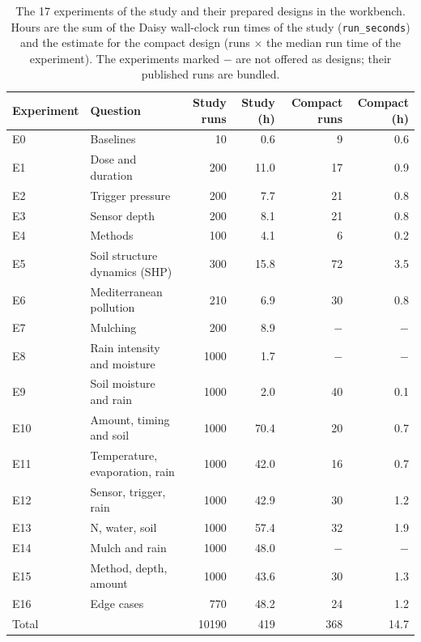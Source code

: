\documentclass[preprint,12pt]{elsarticle}
\begin{document}
\begin{table}[!htbp]\centering\small
\caption{The 17 experiments of the study and their prepared designs in the workbench. Hours are the sum of the Daisy wall-clock run times of the study (\texttt{run\_seconds}) and the estimate for the compact design (runs $\times$ the median run time of the experiment). The experiments marked $-$ are not offered as designs; their published runs are bundled.}\label{tab:designs}
\begin{tabular}{llrrrr}\toprule
Experiment & Question & Study runs & Study (h) & Compact runs & Compact (h)\\\midrule
E0 & Baselines & 10 & 0.6 & 9 & 0.6\\
E1 & Dose and duration & 200 & 11.0 & 17 & 0.9\\
E2 & Trigger pressure & 200 & 7.7 & 21 & 0.8\\
E3 & Sensor depth & 200 & 8.1 & 21 & 0.8\\
E4 & Methods & 100 & 4.1 & 6 & 0.2\\
E5 & Soil structure dynamics (SHP) & 300 & 15.8 & 72 & 3.5\\
E6 & Mediterranean pollution & 210 & 6.9 & 30 & 0.8\\
E7 & Mulching & 200 & 8.9 & $-$ & $-$\\
E8 & Rain intensity and moisture & 1000 & 1.7 & $-$ & $-$\\
E9 & Soil moisture and rain & 1000 & 2.0 & 40 & 0.1\\
E10 & Amount, timing and soil & 1000 & 70.4 & 20 & 0.7\\
E11 & Temperature, evaporation, rain & 1000 & 42.0 & 16 & 0.7\\
E12 & Sensor, trigger, rain & 1000 & 42.9 & 30 & 1.2\\
E13 & N, water, soil & 1000 & 57.4 & 32 & 1.9\\
E14 & Mulch and rain & 1000 & 48.0 & $-$ & $-$\\
E15 & Method, depth, amount & 1000 & 43.6 & 30 & 1.3\\
E16 & Edge cases & 770 & 48.2 & 24 & 1.2\\
\midrule Total & & 10190 & 419 & 368 & 14.7\\\bottomrule\end{tabular}\end{table}
\end{document}
